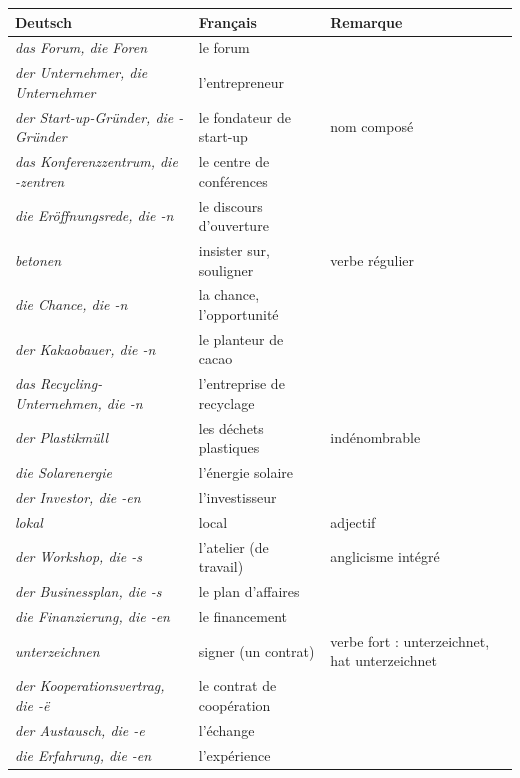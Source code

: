 \documentclass[11pt]{article}
\newcommand{\all}[1]{\ifmmode\text{\textit{#1}}\else\begingroup\selectlanguage{ngerman}\itshape #1\endgroup\fi}
\begin{document}
\begin{definition}
\begin{center}
\begin{tabularx}{\linewidth}{|l|X|X|}
\hline
\rowcolor{popblueL} \textbf{Deutsch} & \textbf{Français} & \textbf{Remarque} \\
\hline
\all{das Forum, die Foren} & le forum &  \\
\all{der Unternehmer, die Unternehmer} & l'entrepreneur &  \\
\all{der Start-up-Gründer, die -Gründer} & le fondateur de start-up & nom composé \\
\all{das Konferenzzentrum, die -zentren} & le centre de conférences &  \\
\all{die Eröffnungsrede, die -n} & le discours d'ouverture & \\
\all{betonen} & insister sur, souligner & verbe régulier \\
\all{die Chance, die -n} & la chance, l'opportunité &  \\
\all{der Kakaobauer, die -n} & le planteur de cacao & \\
\all{das Recycling-Unternehmen, die -n} & l'entreprise de recyclage & \\
\all{der Plastikmüll} & les déchets plastiques & indénombrable \\
\all{die Solarenergie} & l'énergie solaire & \\
\all{der Investor, die -en} & l'investisseur & \\
\all{lokal} & local & adjectif \\
\all{der Workshop, die -s} & l'atelier (de travail) & anglicisme intégré \\
\all{der Businessplan, die -s} & le plan d'affaires & \\
\all{die Finanzierung, die -en} & le financement & \\
\all{unterzeichnen} & signer (un contrat) & verbe fort : unterzeichnet, hat unterzeichnet \\
\all{der Kooperationsvertrag, die -\"{e}} & le contrat de coopération & \\
\all{der Austausch, die -e} & l'échange &  \\
\all{die Erfahrung, die -en} & l'expérience &  \\
\hline
\end{tabularx}
\end{center}
\end{definition}
\end{document}
